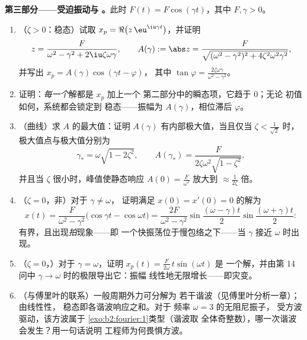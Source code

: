 \begin{problem}
\medskip
\noindent\textbf{第三部分——受迫振动与
。}此时 $F(t) = F\cos(\gamma t)$，其中 $F, \gamma > 0$。
\begin{enumerate}[resume]
  \item （$\zeta > 0$：稳态）试取 $x_p =
        \Re\bigl(z\,\eu^{\iu\gamma t}\bigr)$，并证明
        \[
        z = \frac{F}{\omega^2 - \gamma^2 +
        2\iu\zeta\omega\gamma},
        \qquad
        A(\gamma) := \abs z = \frac{F}{\sqrt{(\omega^2 -
        \gamma^2)^2 + 4\zeta^2\omega^2\gamma^2}} ,
        \]
        并写出 $x_p = A(\gamma)\cos(\gamma t - \varphi)$，
        其中 $\tan\varphi =
        \frac{2\zeta\omega\gamma}{\omega^2-\gamma^2}$。
  \item 证明：\emph{每一个}解都是 $x_p$ 加上一个
        第二部分中的瞬态项，它趋于 $0$；无论
        初值如何，系统都会锁定到
        稳态——振幅为 $A(\gamma)$，相位滞后
        $\varphi$。
  \item （曲线）求 $A$ 的最大值：证明
        $A(\gamma)$ 有内部极大值，当且仅当 $\zeta <
        \frac{1}{\sqrt2}$ 时，极大值点与极大值分别为
        \[
        \gamma_* = \omega\sqrt{1 - 2\zeta^2},
        \qquad
        A(\gamma_*) =
        \frac{F}{2\zeta\omega^2\sqrt{1-\zeta^2}} ,
        \]
        并且当 $\zeta$ 很小时，峰值使静态响应
        $A(0) = \frac F{\omega^2}$ 放大到
        $\approx \frac{1}{2\zeta}$ 倍。
  \item （$\zeta = 0$，非）对于 $\gamma \neq \omega$，
        证明满足 $x(0) = x'(0) = 0$ 的解为
        \[
        x(t) = \frac{F}{\omega^2 -
        \gamma^2}\bigl(\cos\gamma t - \cos\omega t\bigr)
        = \frac{2F}{\omega^2-\gamma^2}
        \sin\frac{(\omega-\gamma)t}{2}
        \sin\frac{(\omega+\gamma)t}{2} :
        \]
        有界，且出现\emph{拍}现象——即
        一个快振荡位于慢包络之下——当 $\gamma$ 接近
        $\omega$ 时出现。
  \item （$\zeta = 0$，）对于 $\gamma = \omega$，证明
        $x_p(t) = \frac{F}{2\omega}\,t\sin(\omega t)$ 是
        一个解，并由第
        14 问中 $\gamma \to \omega$ 时的极限导出它：振幅
        线性地无限增长——即灾变。
  \item （与傅里叶的联系）一般周期外力可分解为
        若干谐波（见傅里叶分析一章）；由线性性，
        稳态即各谐波响应之和。对于
        频率 $\omega = 3$ 的无阻尼振子，
        受方波驱动，该方波属于
        \cref{exo:b2:fourier:1}类型（谐波取
        全体奇整数），哪一次谐波会发生？用一句话说明
        工程师为何畏惧方波。
\end{enumerate}


\end{problem}

